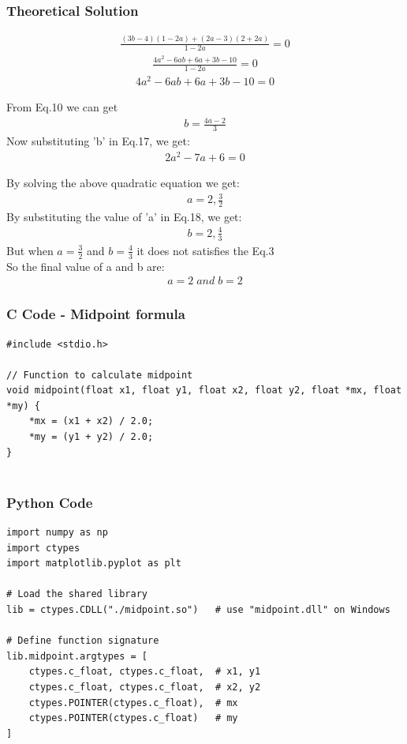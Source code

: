 \documentclass{beamer}
\begin{document}
\begin{frame}
\frametitle{Theoretical Solution}
\begin{align}
    \frac{(3b-4)(1-2a)+(2a-3)(2+2a)}{1-2a}=0
\end{align}
\begin{align}
    \frac{4a^2-6ab+6a+3b-10}{1-2a}=0
\end{align}
\begin{align}
    4a^2-6ab+6a+3b-10=0
\end{align}

From Eq.10 we can get
\begin{align}
    b=\frac{4a-2}{3}
\end{align}
Now substituting 'b' in Eq.17, we get:
\begin{align}
2a^2-7a+6=0
\end{align}

\end{frame}
\begin{frame}
By solving the above quadratic equation we get:
\begin{align}
a=2,\frac{3}{2}
\end{align}
By substituting the value of 'a' in Eq.18, we get:
\begin{align}
b=2,\frac{4}{3}
\end{align}
But when $a=\frac{3}{2}$ and $b=\frac{4}{3}$ it does not satisfies the Eq.3\\
So the final value of a and b are:
\begin{align}
    a=2\;and\;b=2
\end{align}
\end{frame}


\begin{frame}[fragile]
    \frametitle{C Code - Midpoint formula }

    \begin{lstlisting}
#include <stdio.h>

// Function to calculate midpoint
void midpoint(float x1, float y1, float x2, float y2, float *mx, float *my) {
    *mx = (x1 + x2) / 2.0;
    *my = (y1 + y2) / 2.0;
}


    \end{lstlisting}
\end{frame}


\begin{frame}[fragile]
    \frametitle{Python Code}
    \begin{lstlisting}
import numpy as np
import ctypes
import matplotlib.pyplot as plt

# Load the shared library
lib = ctypes.CDLL("./midpoint.so")   # use "midpoint.dll" on Windows

# Define function signature
lib.midpoint.argtypes = [
    ctypes.c_float, ctypes.c_float,  # x1, y1
    ctypes.c_float, ctypes.c_float,  # x2, y2
    ctypes.POINTER(ctypes.c_float),  # mx
    ctypes.POINTER(ctypes.c_float)   # my
]






    \end{lstlisting}
\end{frame}
\end{document}
